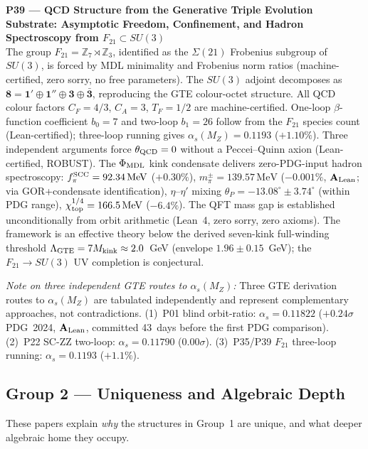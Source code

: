 \documentclass[11pt]{article}
\newcommand{\CatAL}{\ensuremath{\textbf{A}_{\rm Lean}}}
\begin{document}
\medskip
\noindent\textbf{P39 — QCD Structure from the Generative Triple Evolution Substrate:
Asymptotic Freedom, Confinement, and Hadron Spectroscopy from
$F_{21}\subset SU(3)$}~\cite{SpivackGTEQCDStructure}\\
The group $F_{21} = \mathbb{Z}_7 \rtimes \mathbb{Z}_3$, identified as the
$\Sigma(21)$ Frobenius subgroup of $SU(3)$, is forced by MDL minimality and
Frobenius norm ratios (machine-certified, zero sorry, no free parameters).
The $SU(3)$ adjoint decomposes as $\mathbf{8} = \mathbf{1}' \oplus \mathbf{1}''
\oplus \mathbf{3} \oplus \bar{\mathbf{3}}$, reproducing the GTE colour-octet structure.
All QCD colour factors $C_F = 4/3$, $C_A = 3$, $T_F = 1/2$ are
machine-certified.  One-loop $\beta$-function coefficient $b_0 = 7$ and two-loop
$b_1 = 26$ follow from the $F_{21}$ species count (Lean-certified); three-loop
running gives $\alpha_s(M_Z) = 0.1193$ ($+1.10\%$).  Three independent arguments
force $\theta_{\rm QCD} = 0$ without a Peccei--Quinn axion (Lean-certified, ROBUST).
The $\Phi_{\rm MDL}$ kink condensate delivers zero-PDG-input hadron spectroscopy:
$f_\pi^{\rm SCC} = 92.34\,\mathrm{MeV}$ ($+0.30\%$), $m_\pi^\pm = 139.57\,\mathrm{MeV}$
($-0.001\%$, $\CatAL$; via GOR+condensate identification), $\eta$--$\eta'$ mixing $\theta_P = -13.08^\circ \pm 3.74^\circ$ (within PDG
range), $\chi_{\rm top}^{1/4} = 166.5\,\mathrm{MeV}$ ($-6.4\%$).  The QFT mass gap
is established unconditionally from orbit arithmetic (Lean~4, zero sorry, zero axioms).
The framework is an effective theory below the derived seven-kink full-winding
threshold $\Lambda_{\rm GTE} = 7M_{\rm kink} \approx 2.0$~GeV (envelope
$1.96 \pm 0.15$~GeV); the $F_{21} \to SU(3)$ UV completion is conjectural.

\smallskip
\noindent\textit{Note on three independent GTE routes to $\alpha_s(M_Z)$:}
Three GTE derivation routes to $\alpha_s(M_Z)$ are tabulated independently and
represent complementary approaches, not contradictions.
(1)~P01 blind orbit-ratio: $\alpha_s = 0.11822$ ($+0.24\sigma$ PDG~2024, \CatAL,
committed 43~days before the first PDG comparison).
(2)~P22 SC-ZZ two-loop: $\alpha_s = 0.11790$ ($0.00\sigma$).
(3)~P35/P39 $F_{21}$ three-loop running: $\alpha_s = 0.1193$ ($+1.1\%$).

\subsection{Group 2 — Uniqueness and Algebraic Depth}

These papers explain \emph{why} the structures in Group~1 are unique,
and what deeper algebraic home they occupy.
\end{document}
